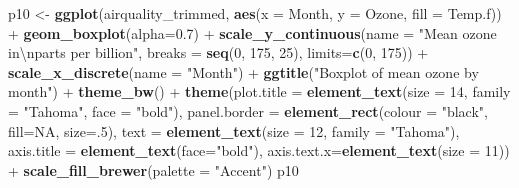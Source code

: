 \documentclass[]{article}
\newenvironment{Shaded}{\begin{snugshade}}{\end{snugshade}}
\newcommand{\KeywordTok}[1]{\textcolor[rgb]{0.13,0.29,0.53}{\textbf{{#1}}}}
\newcommand{\DataTypeTok}[1]{\textcolor[rgb]{0.13,0.29,0.53}{{#1}}}
\newcommand{\DecValTok}[1]{\textcolor[rgb]{0.00,0.00,0.81}{{#1}}}
\newcommand{\FloatTok}[1]{\textcolor[rgb]{0.00,0.00,0.81}{{#1}}}
\newcommand{\CharTok}[1]{\textcolor[rgb]{0.31,0.60,0.02}{{#1}}}
\newcommand{\StringTok}[1]{\textcolor[rgb]{0.31,0.60,0.02}{{#1}}}
\newcommand{\OtherTok}[1]{\textcolor[rgb]{0.56,0.35,0.01}{{#1}}}
\newcommand{\NormalTok}[1]{{#1}}
\begin{document}
\begin{Shaded}
\begin{Highlighting}[]
\NormalTok{p10 <-}\StringTok{ }\KeywordTok{ggplot}\NormalTok{(airquality_trimmed, }\KeywordTok{aes}\NormalTok{(}\DataTypeTok{x =} \NormalTok{Month, }\DataTypeTok{y =} \NormalTok{Ozone, }\DataTypeTok{fill =} \NormalTok{Temp.f)) +}\StringTok{ }
\StringTok{  }\KeywordTok{geom_boxplot}\NormalTok{(}\DataTypeTok{alpha=}\FloatTok{0.7}\NormalTok{) +}
\StringTok{  }\KeywordTok{scale_y_continuous}\NormalTok{(}\DataTypeTok{name =} \StringTok{"Mean ozone in}\CharTok{\textbackslash{}n}\StringTok{parts per billion"}\NormalTok{,}
    \DataTypeTok{breaks =} \KeywordTok{seq}\NormalTok{(}\DecValTok{0}\NormalTok{, }\DecValTok{175}\NormalTok{, }\DecValTok{25}\NormalTok{), }\DataTypeTok{limits=}\KeywordTok{c}\NormalTok{(}\DecValTok{0}\NormalTok{, }\DecValTok{175}\NormalTok{)) +}
\StringTok{  }\KeywordTok{scale_x_discrete}\NormalTok{(}\DataTypeTok{name =} \StringTok{"Month"}\NormalTok{) +}
\StringTok{  }\KeywordTok{ggtitle}\NormalTok{(}\StringTok{"Boxplot of mean ozone by month"}\NormalTok{) +}
\StringTok{  }\KeywordTok{theme_bw}\NormalTok{() +}
\StringTok{  }\KeywordTok{theme}\NormalTok{(}\DataTypeTok{plot.title =} \KeywordTok{element_text}\NormalTok{(}\DataTypeTok{size =} \DecValTok{14}\NormalTok{, }\DataTypeTok{family =} \StringTok{"Tahoma"}\NormalTok{, }\DataTypeTok{face =} \StringTok{"bold"}\NormalTok{),}
    \DataTypeTok{panel.border =} \KeywordTok{element_rect}\NormalTok{(}\DataTypeTok{colour =} \StringTok{"black"}\NormalTok{, }\DataTypeTok{fill=}\OtherTok{NA}\NormalTok{, }\DataTypeTok{size=}\NormalTok{.}\DecValTok{5}\NormalTok{),}
    \DataTypeTok{text =} \KeywordTok{element_text}\NormalTok{(}\DataTypeTok{size =} \DecValTok{12}\NormalTok{, }\DataTypeTok{family =} \StringTok{"Tahoma"}\NormalTok{),}
    \DataTypeTok{axis.title =} \KeywordTok{element_text}\NormalTok{(}\DataTypeTok{face=}\StringTok{"bold"}\NormalTok{),}
    \DataTypeTok{axis.text.x=}\KeywordTok{element_text}\NormalTok{(}\DataTypeTok{size =} \DecValTok{11}\NormalTok{)) +}
\StringTok{  }\KeywordTok{scale_fill_brewer}\NormalTok{(}\DataTypeTok{palette =} \StringTok{"Accent"}\NormalTok{)}
\NormalTok{p10}
\end{Highlighting}
\end{Shaded}
\end{document}
